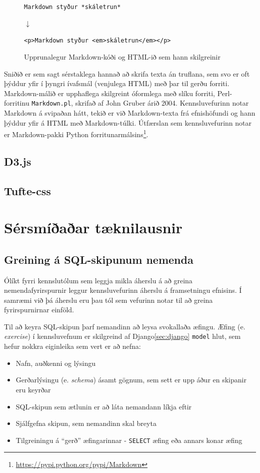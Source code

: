 \documentclass[a4paper,12pt,twoside,BCOR=10mm]{scrbook}
\begin{document}
\begin{figure}
\caption{Upprunalegur Markdown-kóði og HTML-ið sem hann skilgreinir}
\label{fig:markdown}
\begin{center}
\texttt{Markdown styður *skáletrun*}

$\downarrow$

\texttt{<p>Markdown styður <em>skáletrun</em></p>}

\end{center}
\end{figure}

Sniðið er sem sagt sérstaklega hannað að skrifa texta án truflana, sem svo er oft þýddur yfir í þyngri ívafsmál (venjulega HTML) með þar til gerðu forriti. Markdown-málið er upphaflega skilgreint óformlega með slíku forriti, Perl-forritinu \texttt{Markdown.pl}, skrifað af John Gruber árið 2004. Kennsluvefurinn notar Markdown á svipaðan hátt, tekið er við Markdown-texta frá efnishöfundi og hann þýddur yfir á HTML með Markdown-túlki. Útfærslan sem kennsluvefurinn notar er Markdown-pakki Python forritunarmálsins\footnote{\url{https://pypi.python.org/pypi/Markdown}}.

\subsection{D3.js}
\subsection{Tufte-css}
\label{sec:tufte-css}
\section{Sérsmíðaðar tæknilausnir}
\subsection{Greining á SQL-skipunum nemenda}
\label{sec:command-analysis}
Ólíkt fyrri kennslutólum sem leggja mikla áherslu á að greina nemendafyrirspurnir\cite{mitrovic1998, bhagat2002} leggur kennsluvefurinn áherslu á framsetningu efnisins. Í samræmi við þá áherslu eru þau tól sem vefurinn notar til að greina fyrirspurnirnar einföld.

Til að keyra SQL-skipun þarf nemandinn að leysa svokallaða æfingu. Æfing (e. \emph{exercise}) í kennsluvefnum er skilgreind af Django\ref{sec:django} \texttt{model} hlut, sem hefur nokkra eiginleika sem vert er að nefna:

\begin{itemize}
 \item Nafn, auðkenni og lýsingu
 \item Gerðarlýsingu (e. \emph{schema}) ásamt gögnum, sem sett er upp áður en skipanir eru keyrðar
 \item SQL-skipun sem ætlunin er að láta nemandann líkja eftir
 \item Sjálfgefna skipun, sem nemandinn skal breyta
 \item Tilgreiningu á ``gerð'' æfingarinnar - \texttt{SELECT} æfing eða annars konar æfing
\end{itemize}
\end{document}
